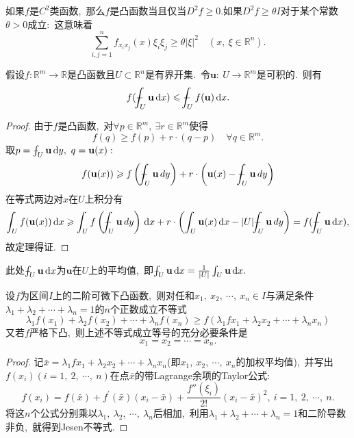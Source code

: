 如果$f$是$C^2$类函数,\ 那么$f$是凸函数当且仅当$D^2f\geqslant 0.$如果$D^2f\geqslant\theta I$对于某个常数$\theta>0$成立:\ 这意味着
$$\sum_{i,j=1}^nf_{x_ix_j}(x)\xi_i\xi_j\geq\theta|\xi|^2\quad(x,\ \xi\in\mathbb{R}^n).$$
\begin{theorem}
	假设$f:\mathbb{R}^m\to\mathbb{R}$是凸函数且$U\subset\mathbb{R}^n$是有界开集.\ 令$\mathbf{u}:\ U\to\mathbb{R}^m$是可积的.\ 则有
	$$f(\dashint_U\mathbf{u}\,\mathrm{d}x)\leqslant\dashint_Uf(\mathbf{u})\,\mathrm{d}x.$$
\end{theorem}
\begin{proof}
	由于$f$是凸函数,\ 对$\forall p\in\mathbb{R}^m,\ \exists r\in\mathbb{R}^m$使得
	$$f(q)\geqslant f(p)+r\cdot (q-p)\quad\forall q\in\mathbb{R}^m.$$
	取$p=\dashint_U\mathbf{u}\,\mathrm{d}y,\ q=\mathbf{u}(x):$
	$$f(\mathbf{u}(x))\geqslant f\left(\dashint_{U}\mathbf{u}\,dy\right)+r\cdot\left(\mathbf{u}(x)-\dashint_{U}\mathbf{u}\,dy\right)$$
	在等式两边对$x$在$U$上积分有
	$$\int_Uf(\mathbf{u}(x))\,\mathrm{d}x\geqslant \int_Uf\left(\dashint_{U}\mathbf{u}\,dy\right)\,\mathrm{d}x+r\cdot\left(\int_U\mathbf{u}(x)\,\mathrm{d}x-|U|\dashint_{U}\mathbf{u}\,dy\right)=f(\dashint_U\mathbf{u}\,\mathrm{d}x),$$
	故定理得证.
\end{proof}
\begin{note}
	此处$\dashint_U\mathbf{u}\,\mathrm{d}x$为$\mathbf{u}$在$U$上的平均值,\ 即$\dashint_U\mathbf{u}\,\mathrm{d}x=\frac{1}{|U|}\int_U\mathbf{u}\,\mathrm{d}x.$
\end{note}
\begin{proposition}[$C^2$下凸函数的Jesen不等式]
	设$f$为区间$I$上的二阶可微下凸函数,\ 则对任和$x_1,\ x_2,\ \cdots,\ x_n\in I$与满足条件$\lambda_1+\lambda_2+\cdots+\lambda_n=1$的$n$个正数成立不等式
	$$\lambda_1f(x_1)+\lambda_2f(x_2)+\cdots+\lambda_nf(x_n)\geqslant f(\lambda_1fx_1+\lambda_2x_2+\cdots+\lambda_nx_n)$$
	又若$f$严格下凸,\ 则上述不等式成立等号的充分必要条件是
	$$x_1=x_2=\cdots=x_n.$$
\end{proposition}
\begin{proof}
	记$\bar{x}=\lambda_1fx_1+\lambda_2x_2+\cdots+\lambda_nx_n$(即$x_1,\ x_2,\ \cdots,\ x_n$的加权平均值),\ 并写出$f(x_i)(i=1,\ 2,\ \cdots,\ n)$在点$\bar{x}$的带Lagrange余项的Taylor公式:
	$$f(x_i)=f(\bar{x})+f^{\prime}(\bar{x})(x_i-\bar{x})+\frac{f''(\xi_i)}{2!}(x_i-\bar{x})^2,\ i=1,\ 2,\ \cdots,\ n.$$
	将这$n$个公式分别乘以$\lambda_{1},\ \lambda_{2},\ \cdots,\ \lambda_{n}$后相加,\ 利用$\lambda_1+\lambda_2+\cdots+\lambda_n=1$和二阶导数非负,\ 就得到Jesen不等式.
\end{proof}
